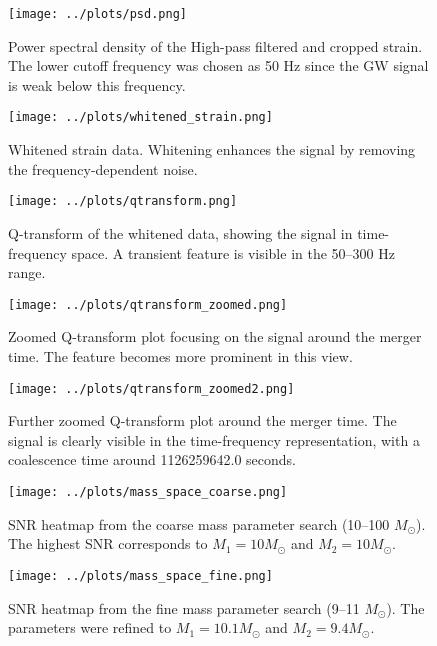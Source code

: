 \documentclass{article}
\begin{document}
\begin{figure}[H]
    \centering
    \texttt{[image: ../plots/psd.png]}
    \caption{Power spectral density of the High-pass filtered and cropped strain. The lower cutoff frequency was chosen as 50 Hz since the GW signal is weak below this frequency.}
    \label{fig:psd}
\end{figure}

\begin{figure}[H]
    \centering
    \texttt{[image: ../plots/whitened\_strain.png]}
    \caption{Whitened strain data. Whitening enhances the signal by removing the frequency-dependent noise.}
    \label{fig:whitened_strain}
\end{figure}

\begin{figure}[H]
    \centering
    \texttt{[image: ../plots/qtransform.png]}
    \caption{Q-transform of the whitened data, showing the signal in time-frequency space. A transient feature is visible in the 50--300 Hz range.}
    \label{fig:qtransform}
\end{figure}

\begin{figure}[H]
    \centering
    \texttt{[image: ../plots/qtransform\_zoomed.png]}
    \caption{Zoomed Q-transform plot focusing on the signal around the merger time. The feature becomes more prominent in this view.}
    \label{fig:qtransform_zoomed}
\end{figure}

\begin{figure}[H]
    \centering
    \texttt{[image: ../plots/qtransform\_zoomed2.png]}
    \caption{Further zoomed Q-transform plot around the merger time. The signal is clearly visible in the time-frequency representation, with a coalescence time around 1126259642.0 seconds.}
    \label{fig:qtransform_zoomed2}
\end{figure}

\begin{figure}[H]
    \centering
    \texttt{[image: ../plots/mass\_space\_coarse.png]}
    \caption{SNR heatmap from the coarse mass parameter search (10--100 $M_\odot$). The highest SNR corresponds to $M_1 = 10 M_\odot$ and $M_2 = 10 M_\odot$.}
    \label{fig:mass_space_coarse}
\end{figure}

\begin{figure}[H]
    \centering
    \texttt{[image: ../plots/mass\_space\_fine.png]}
    \caption{SNR heatmap from the fine mass parameter search (9--11 $M_\odot$). The parameters were refined to $M_1 = 10.1 M_\odot$ and $M_2 = 9.4 M_\odot$.}
    \label{fig:mass_space_fine}
\end{figure}
\end{document}
